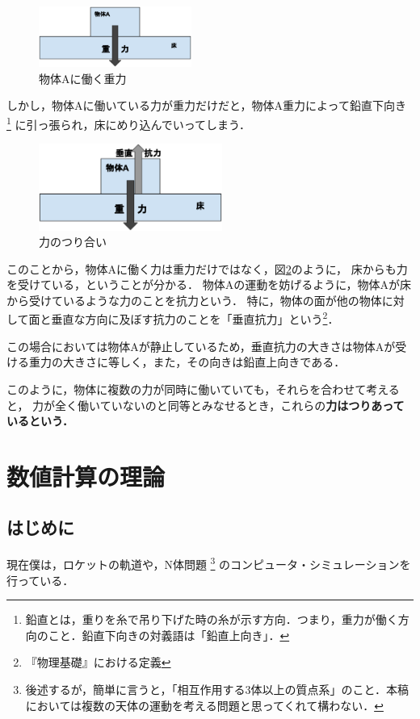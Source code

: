 \documentclass[b5paper]{ujreport}
\begin{document}
\begin{figure}[htbp]
\begin{center}
\includegraphics[width=5cm]{img/力のつり合い-重力.eps}
\end{center}
\caption{物体Aに働く重力}
\label{object_on_floor_with_gravity}
\end{figure}

しかし，物体Aに働いている力が重力だけだと，物体A重力によって鉛直下向き
\footnote{鉛直とは，重りを糸で吊り下げた時の糸が示す方向．つまり，重力が働く方向のこと．鉛直下向きの対義語は「鉛直上向き」．}
に引っ張られ，床にめり込んでいってしまう．

\begin{figure}[htbp]
\begin{center}
\includegraphics[width=6cm]{img/力のつり合い.eps}
\end{center}
\label{object_on_floor_with_balance}
\caption{力のつり合い}
\end{figure}

このことから，物体Aに働く力は重力だけではなく，図\ref{object_on_floor_with_balance}のように，
床からも力を受けている，ということが分かる．
物体Aの運動を妨げるように，物体Aが床から受けているような力のことを抗力という．
特に，物体の面が他の物体に対して面と垂直な方向に及ぼす抗力のことを「垂直抗力」という\footnote{『物理基礎』における定義}．

この場合においては物体Aが静止しているため，垂直抗力の大きさは物体Aが受ける重力の大きさに等しく，また，その向きは鉛直上向きである．

このように，物体に複数の力が同時に働いていても，それらを合わせて考えると，
力が全く働いていないのと同等とみなせるとき，これらの\bfseries{力はつりあっている}という．

\chapter{数値計算の理論}
\section{はじめに}
現在僕は，ロケットの軌道や，N体問題
\footnote{後述するが，簡単に言うと，「相互作用する3体以上の質点系」のこと．本稿においては複数の天体の運動を考える問題と思ってくれて構わない．}
のコンピュータ・シミュレーションを行っている．
\end{document}
